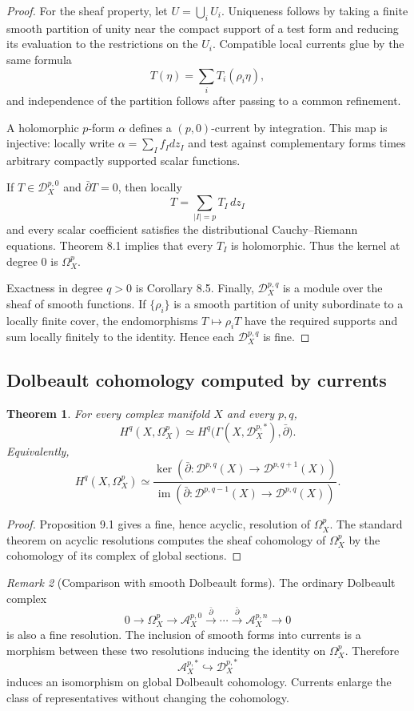 \documentclass[11pt,a4paper]{article}
\newtheorem{theorem}{Theorem}[section]
\theoremstyle{definition}
\theoremstyle{remark}
\newtheorem{remark}[theorem]{Remark}
\newcommand{\A}{\mathcal A}
\newcommand{\Dcur}{\mathcal D}
\newcommand{\ddbar}{\bar\partial}
\begin{document}
\begin{proof}
For the sheaf property, let $U=\bigcup_iU_i$. Uniqueness follows by taking a finite smooth partition of unity near the compact support of a test form and reducing its evaluation to the restrictions on the $U_i$. Compatible local currents glue by the same formula
\[
T(\eta)=\sum_iT_i(\rho_i\eta),
\]
and independence of the partition follows after passing to a common refinement.

A holomorphic $p$-form $\alpha$ defines a $(p,0)$-current by integration. This map is injective: locally write $\alpha=\sum_I f_I dz_I$ and test against complementary forms times arbitrary compactly supported scalar functions.

If $T\in\Dcur_X^{p,0}$ and $\ddbar T=0$, then locally
\[
T=\sum_{|I|=p}T_I\,dz_I
\]
and every scalar coefficient satisfies the distributional Cauchy--Riemann equations. Theorem 8.1 implies that every $T_I$ is holomorphic. Thus the kernel at degree $0$ is $\Omega_X^p$.

Exactness in degree $q>0$ is Corollary 8.5. Finally, $\Dcur_X^{p,q}$ is a module over the sheaf of smooth functions. If $\{\rho_i\}$ is a smooth partition of unity subordinate to a locally finite cover, the endomorphisms $T\mapsto\rho_iT$ have the required supports and sum locally finitely to the identity. Hence each $\Dcur_X^{p,q}$ is fine.
\end{proof}

\subsection{Dolbeault cohomology computed by currents}

\begin{theorem}
For every complex manifold $X$ and every $p,q$,
\[
H^q(X,\Omega_X^p)
\simeq
H^q\bigl(\Gamma(X,\Dcur_X^{p,*}),\ddbar\bigr).
\tag{9.2}
\]
Equivalently,
\[
H^q(X,\Omega_X^p)
\simeq
\frac{\ker(\ddbar:\Dcur^{p,q}(X)\to\Dcur^{p,q+1}(X))}
{\operatorname{im}(\ddbar:\Dcur^{p,q-1}(X)\to\Dcur^{p,q}(X))}.
\]
\end{theorem}

\begin{proof}
Proposition 9.1 gives a fine, hence acyclic, resolution of $\Omega_X^p$. The standard theorem on acyclic resolutions computes the sheaf cohomology of $\Omega_X^p$ by the cohomology of its complex of global sections.
\end{proof}

\begin{remark}[Comparison with smooth Dolbeault forms]
The ordinary Dolbeault complex
\[
0\to\Omega_X^p\to\A_X^{p,0}\xrightarrow{\ddbar}\cdots\xrightarrow{\ddbar}\A_X^{p,n}\to0
\]
is also a fine resolution. The inclusion of smooth forms into currents is a morphism between these two resolutions inducing the identity on $\Omega_X^p$. Therefore
\[
\A_X^{p,*}\hookrightarrow\Dcur_X^{p,*}
\]
induces an isomorphism on global Dolbeault cohomology. Currents enlarge the class of representatives without changing the cohomology.
\end{remark}
\end{document}

